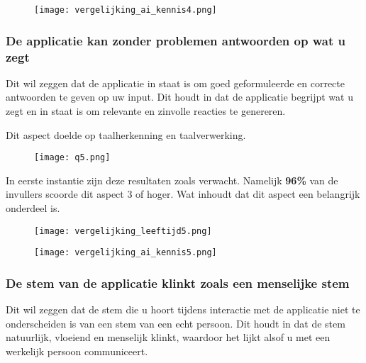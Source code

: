 \begin{figure}[htbp]
    \centering
    \texttt{[image: vergelijking\_ai\_kennis4.png]}
    \label{fig:vergelijking_ai_kennis4}
\end{figure}

\newpage

\subsubsection{De applicatie kan zonder problemen antwoorden op wat u zegt}

Dit wil zeggen  dat de applicatie in staat is om goed geformuleerde en correcte antwoorden te geven op uw input. Dit houdt in dat de applicatie begrijpt wat u zegt en in staat is om relevante en zinvolle reacties te genereren. 

Dit aspect doelde op taalherkenning en taalverwerking.

\begin{figure}[htbp]
    \centering
    \texttt{[image: q5.png]}
    \label{fig:vraag_5_resultaat}
\end{figure}

In eerste instantie zijn deze resultaten zoals verwacht. Namelijk \textbf{96\%} van de invullers scoorde dit aspect 3 of hoger. Wat inhoudt dat dit aspect een belangrijk onderdeel is.

\begin{figure}[htbp]
    \centering
    \texttt{[image: vergelijking\_leeftijd5.png]}
    \label{fig:vergelijking_leeftijd5}
\end{figure}

\begin{figure}[htbp]
    \centering
    \texttt{[image: vergelijking\_ai\_kennis5.png]}
    \label{fig:vergelijking_ai_kennis5}
\end{figure}

\newpage

\subsubsection{De stem van de applicatie klinkt zoals een menselijke stem}

Dit wil zeggen dat de stem die u hoort tijdens interactie met de applicatie niet te onderscheiden is van een stem van een echt persoon. Dit houdt in dat de stem natuurlijk, vloeiend en menselijk klinkt, waardoor het lijkt alsof u met een werkelijk persoon communiceert.

